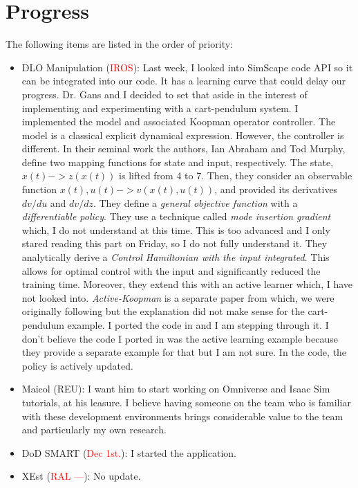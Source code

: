 \documentclass[11pt]{article}
\begin{document}
\section{Progress}
The following items are listed in the order of priority:
\begin{itemize}
    \item DLO Manipulation (\textcolor{red}{IROS}):
    Last week, I looked into SimScape code API so it can be integrated into
    our code. It has a learning curve that could delay our progress. Dr. Gans
    and I decided to set that aside in the interest of implementing and
    experimenting with a cart-pendulum system. I implemented the model and
    associated Koopman operator controller. The model is a classical explicit
    dynamical expression. However, the controller is different. In their seminal
    work the authors, Ian Abraham and Tod Murphy, define two mapping functions
    for state and input, respectively. The state, $x(t)->z(x(t))$ is lifted
    from 4 to 7. Then, they consider an observable function $x(t),u(t)->v(x(t),u(t))$,
    and provided its derivatives $dv/du$ and $dv/dz$. They define a \emph{general
    objective function} with a \emph{differentiable policy}. They use a technique
    called \emph{mode insertion gradient} which, I do not understand at this time.
    This is too advanced and I only stared reading this part on Friday, so I do
    not fully understand it. They analytically derive a \emph{Control Hamiltonian
    with the input integrated}. This allows for optimal control with the input
    and significantly reduced the training time. Moreover, they extend this
    with an active learner which, I have not looked into.
    \emph{Active-Koopman} is a separate paper \cite{abraham2019active} from
    \cite{abraham2017model} which, we were originally following but the explanation
    did not make sense for the cart-pendulum example.
    I ported the code in and I am stepping through it. I don't believe the code
    I ported in was the active learning example because they provide a separate
    example for that but I am not sure. In the code, the policy is actively
    updated.  \\
    \item Maicol (REU): I want him to start working on Omniverse and Isaac Sim
    tutorials, at his leasure. I believe having someone on the team who is
    familiar with these development environments brings considerable value to
    the team and particularly my own research.\\
    \item DoD SMART (\textcolor{red}{Dec 1st.}): I started the application.\\
    \item XEst (\textcolor{red}{RAL ---}): No update.\\
  \end{itemize}
\newpage

\newpage


\end{document}
